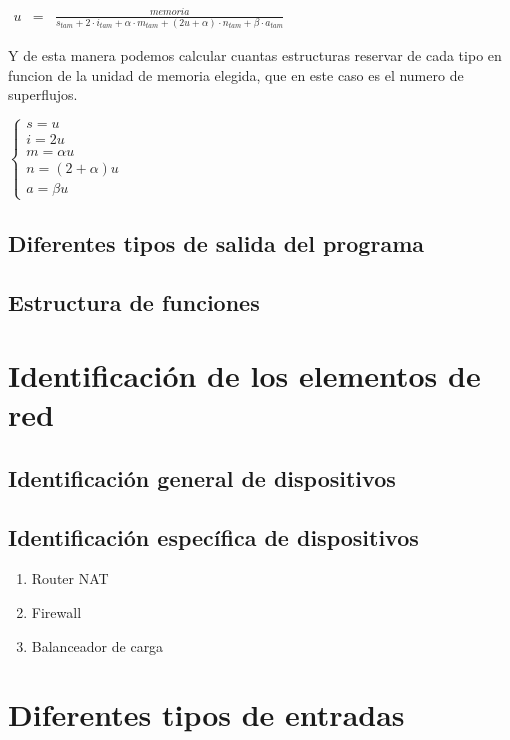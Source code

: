 \documentclass[twoside, 12pt]{epstfg}
\begin{document}
$\begin{array}{lcl}
	u & = & \frac{memoria}{s_{tam} + 2 \cdot i_{tam} + \alpha \cdot m_{tam} + (2u+\alpha) \cdot n_{tam} + \beta \cdot a_{tam}}
\end{array}$

Y de esta manera podemos calcular cuantas estructuras reservar de cada tipo en funcion de la unidad de memoria elegida, que en este caso es el numero de superflujos.

$\begin{cases}
	s = u\\ 
	i = 2u\\ 
	m = \alpha u\\
	n = (2+\alpha)u\\
	a = \beta u
\end{cases}$

\subsection{Diferentes tipos de salida del programa}

\subsection{Estructura de funciones}

\section{Identificación de los elementos de red}
\subsection{Identificación general de dispositivos}
\subsection{Identificación específica de dispositivos}
\begin{enumerate}[itemsep=0pt, topsep = 0pt]
\item Router NAT
\item Firewall
\item Balanceador de carga
\end{enumerate}

\section{Diferentes tipos de entradas}
\end{document}
